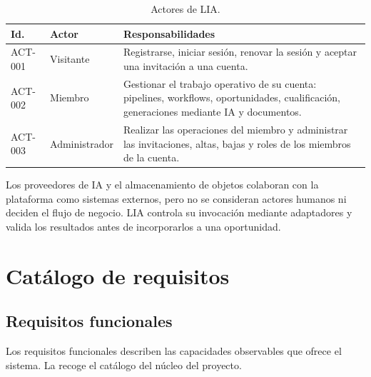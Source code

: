 \begin{table}[H]
  \centering
  \small
  \caption{Actores de LIA.}
  \label{tab:requirements-actors}
  \begin{tabular}{@{}p{1.8cm}p{2.8cm}p{8.5cm}@{}}
    \toprule
    \textbf{Id.} & \textbf{Actor} & \textbf{Responsabilidades} \\
    \midrule
    ACT-001 & Visitante & Registrarse, iniciar sesión, renovar la sesión y aceptar una invitación a una cuenta. \\
    ACT-002 & Miembro & Gestionar el trabajo operativo de su cuenta: pipelines, workflows, oportunidades, cualificación, generaciones mediante IA y documentos. \\
    ACT-003 & Administrador & Realizar las operaciones del miembro y administrar las invitaciones, altas, bajas y roles de los miembros de la cuenta. \\
    \bottomrule
  \end{tabular}
\end{table}

Los proveedores de IA y el almacenamiento de objetos colaboran con la
plataforma como sistemas externos, pero no se consideran actores humanos ni
deciden el flujo de negocio. LIA controla su invocación mediante adaptadores y
valida los resultados antes de incorporarlos a una oportunidad.

\section{Catálogo de requisitos}

\subsection{Requisitos funcionales}

Los requisitos funcionales describen las capacidades observables que ofrece el
sistema. La  recoge el catálogo del núcleo del
proyecto.

